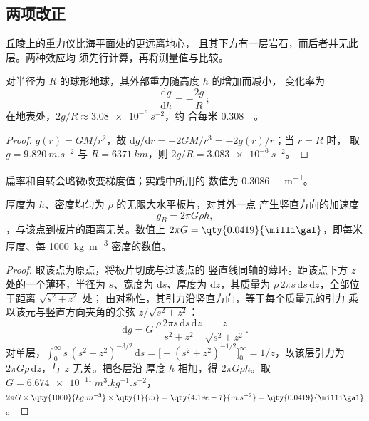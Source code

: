\subsection*{两项改正}

丘陵上的重力仪比海平面处的更远离地心，
且其下方有一层岩石，而后者并无此层。两种效应均
须先行计算，再将测量值与比较。

\begin{proposition}[自由空气梯度]\label{prop:b1:isostasy-gravity:free-air}
对半径为 $R$ 的球形地球，其外部重力随高度 $h$ 的增加而减小，
变化率为
\[
  \frac{\mathrm dg}{\mathrm dh} = -\frac{2g}{R}\,;
\]
在地表处，$2g/R \approx \qty{3.08e-6}{s^{-2}}$，约
合每米 \qty{0.308}{\milli\gal}。
\end{proposition}

\begin{proof}
$g(r) = GM/r^2$，故 $\mathrm dg/\mathrm dr = -2GM/r^3 = -2g(r)/r$；当 $r = R$ 时，
取 $g = \qty{9.820}{m.s^{-2}}$ 与 $R = \qty{6371}{km}$，则 $2g/R =
\qty{3.083e-6}{s^{-2}}$。
\end{proof}

扁率和自转会略微改变梯度值；实践中所用的
数值为 \qty{0.3086}{\milli\gal.m^{-1}}。

\begin{proposition}[布格板片]\label{prop:b1:isostasy-gravity:slab}
厚度为 $h$、密度均匀为 $\rho$ 的无限大水平板片，对其外一点
产生竖直方向的加速度
\[
  g_B = 2\pi G\rho h ,
\]
，与该点到板片的距离无关。数值上 $2\pi G =
\qty{0.0419}{\milli\gal}$，即每米厚度、每 \qty{1000}{kg.m^{-3}}
密度的数值。
\end{proposition}

\begin{proof}
取该点为原点，将板片切成与过该点的
竖直线同轴的薄环。距该点下方 $z$ 处的一个薄环，半径为
$s$、宽度为 $\mathrm ds$、厚度为 $\mathrm dz$，其质量为
$\rho\,2\pi s\,\mathrm ds\,\mathrm dz$，全部位于距离 $\sqrt{s^2 + z^2}$ 处；
由对称性，其引力沿竖直方向，等于每个质量元的引力
乘以该元与竖直方向夹角的余弦 $z/\sqrt{s^2+z^2}$：
\[
  \mathrm dg = G\,\frac{\rho\,2\pi s\,\mathrm ds\,\mathrm dz}{s^2 + z^2}\,
  \frac{z}{\sqrt{s^2 + z^2}} .
\]
对单层，$\int_0^\infty s\,(s^2 + z^2)^{-3/2}\,\mathrm ds =
\bigl[-(s^2 + z^2)^{-1/2}\bigr]_0^\infty = 1/z$，故该层引力为
$2\pi G\rho\,\mathrm dz$，与 $z$ 无关。把各层沿
厚度 $h$ 相加，得 $2\pi G\rho h$。取 $G = \qty{6.674e-11}{m^3.kg^{-1}.s^{-2}}$，
$2\pi G\times\qty{1000}{kg.m^{-3}}\times\qty{1}{m} = \qty{4.19e-7}{m.s^{-2}} =
\qty{0.0419}{\milli\gal}$。
\end{proof}

